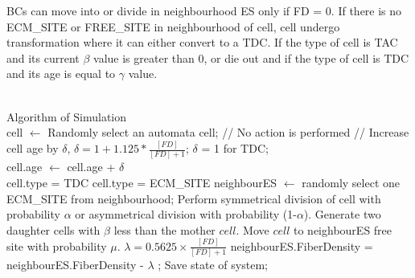\noindent BCs can move into or divide in neighbourhood ES only if FD = 0. 
If there is no ECM\_SITE or FREE\_SITE in neighbourhood of cell, 
cell undergo transformation where it can either convert to a TDC. If the type of cell is TAC and its current $\beta$ value is greater than 0, 
or die out and if the type of cell is TDC and its age is equal to $\gamma$ value.\\\

\begin{algorithm}[H]
	\label{algori}
	\SetAlgoLined
	\noindent Algorithm of Simulation\\
	{
		{
			cell  $\gets$ Randomly select an automata cell;			
			{
				// No action is performed
			}
			{   
				// Increase cell age by $\delta$, $\delta =  1 + 1.125 *  \frac{[FD]}{[FD]+1}$; $\delta$ = 1 for TDC; \\
				cell.age  $\gets$ cell.age + $\delta$  \\				
				{
					{				      
						cell.type = TDC
					}					
					{ 
						cell.type = ECM\_SITE
					}
				}
				{
					neighbourES  $\gets$ randomly select one ECM\_SITE from neighbourhood;										
					{				      						
						{
							{				      
								Perform symmetrical division of cell with probability $\alpha$ or asymmetrical division with probability (1-$\alpha$).
							}
							{ 					  
								Generate two daughter cells with $\beta$ less than the mother $cell$.
							}	
						}
						{				    
							Move $cell$ to neighbourES free site with probability $\mu$.   	      
						}						
					}
					{												
						$\lambda = 0.5625\times \frac{{[FD]}}{[FD]+1} $\; 
						neighbourES.FiberDensity = neighbourES.FiberDensity - $\lambda$ ;
					}
				}								
			}	   	   			
		}
		Save state of system;
	}
\end{algorithm}
